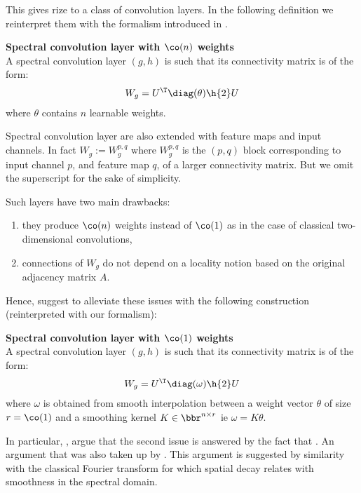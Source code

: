 This gives rize to a class of convolution layers. In the following definition we reinterpret them with the formalism introduced in .

\begin{definition}\textbf{Spectral convolution layer with $\co(n)$ weights}\\
A spectral convolution layer $(g,h)$ is such that its connectivity matrix is of the form:
\begin{gather*}
W_g = U^{\T} \diag(\theta) \h{2} U
\end{gather*}
where $\theta$ contains $n$ learnable weights.
\end{definition}

\begin{remark}Spectral convolution layer are also extended with feature maps and input channels. In fact $W_g := W_g^{p,q}$ where $W_g^{p,q}$ is the $(p,q)$ block corresponding to input channel $p$, and feature map $q$, of a larger connectivity matrix. But we omit the superscript for the sake of simplicity.
\end{remark}

Such layers have two main drawbacks:
\begin{enumerate}
  \item they produce $\co(n)$ weights instead of $\co(1)$ as in the case of classical two-dimensional convolutions,
  \item connections of $W_g$ do not depend on a locality notion based on the original adjacency matrix $A$.
\end{enumerate}

Hence, \cite{bruna2013spectral} suggest to alleviate these issues with the following construction (reinterpreted with our formalism):

\begin{definition}\textbf{Spectral convolution layer with $\co(1)$ weights}\\
A spectral convolution layer $(g,h)$ is such that its connectivity matrix is of the form:
\begin{gather*}
W_g = U^{\T} \diag(\omega) \h{2} U
\end{gather*}
where $\omega$ is obtained from smooth interpolation between a weight vector $\theta$ of size $r = \co(1)$ and a smoothing kernel $K \in \bbr^{n \times r}$ ie $\omega = K \theta$.
\end{definition}

In particular, \cite{bruna2013spectral}, argue that the second issue is answered by the fact that . An argument that was also taken up by \cite{henaff2015deep}. This argument is suggested by similarity with the classical Fourier transform for which spatial decay relates with smoothness in the spectral domain.

